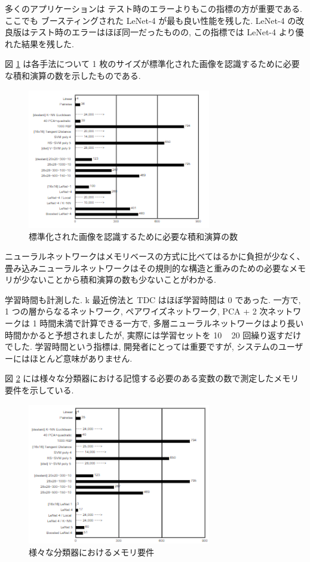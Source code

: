 \documentclass[twocolumn]{jarticle}     %
\begin{document}
多くのアプリケーションは テスト時のエラーよりもこの指標の方が重要である. ここでも ブースティングされた LeNet-4 が最も良い性能を残した. LeNet-4 の改良版はテスト時のエラーはほぼ同一だったものの, この指標では LeNet-4 より優れた結果を残した.
\par
図 \ref{fig:11} は各手法について 1 枚のサイズが標準化された画像を認識するために必要な積和演算の数を示したものである. 
\begin{figure}[t]
  \centering
  \includegraphics[width=80mm]{assets/11.png}
  \caption{標準化された画像を認識するために必要な積和演算の数}
  \label{fig:11}
\end{figure}
ニューラルネットワークはメモリベースの方式に比べてはるかに負担が少なく、畳み込みニューラルネットワークはその規則的な構造と重みのための必要なメモリが少ないことから積和演算の数も少ないことがわかる. 
\par
学習時間も計測した. k 最近傍法と TDC はほぼ学習時間は 0 であった.
一方で, 1 つの層からなるネットワーク, ペアワイズネットワーク, PCA + 2 次ネットワークは 1 時間未満で計算できる一方で, 多層ニューラルネットワークはより長い時間かかると予想されましたが, 実際には学習セットを 10 ~ 20 回繰り返すだけでした.
学習時間という指標は, 開発者にとっては重要ですが, システムのユーザーにはほとんど意味がありません.
\par
図 \ref{fig:12} には様々な分類器における記憶する必要のある変数の数で測定したメモリ要件を示している.
\begin{figure}[t]
  \centering
  \includegraphics[width=80mm]{assets/12.png}
  \caption{様々な分類器におけるメモリ要件}
  \label{fig:12}
\end{figure}
\end{document}
